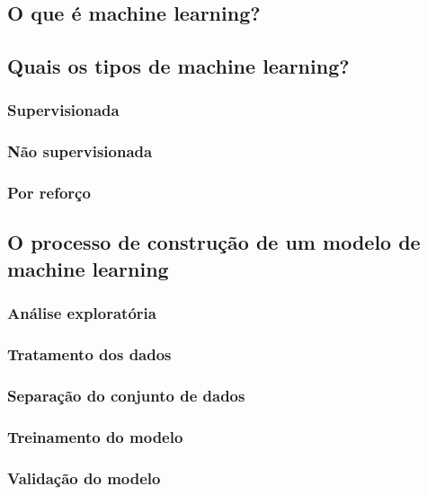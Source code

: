\subsection{O que é machine learning?}

\subsection{Quais os tipos de machine learning?}
\subsubsection{Supervisionada}
\subsubsection{Não supervisionada}
\subsubsection{Por reforço}

\subsection{O processo de construção de um modelo de machine learning}
\subsubsection{Análise exploratória}
\subsubsection{Tratamento dos dados}
\subsubsection{Separação do conjunto de dados}
\subsubsection{Treinamento do modelo}
\subsubsection{Validação do modelo}
